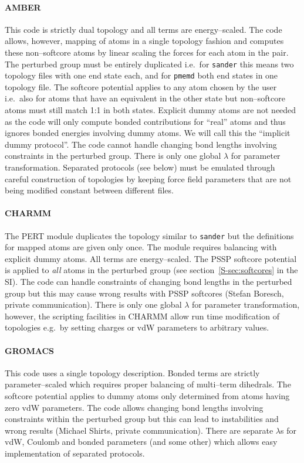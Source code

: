 \documentclass[journal=jctcce,manuscript=article]{achemso}
\newcommand{\progname}[1]{\texttt{#1}}
\begin{document}
\paragraph{AMBER} This code is strictly dual topology and all terms
are energy--scaled.  The code allows, however, mapping of atoms in a
single topology fashion and computes these non--softcore atoms 
by linear scaling the forces for each atom in the pair. 
The perturbed group must be entirely duplicated i.e.\ for \progname{sander} 
this means two topology files with one end state each, and for \progname{pmemd} 
both end states in one topology file.  The softcore potential applies to any 
atom chosen by the user i.e.\ also for atoms that have an equivalent in the 
other state but non--softcore atoms must still match 1:1 in both states.  
Explicit dummy atoms are not needed as the code will only compute bonded 
contributions for ``real'' atoms and thus ignores bonded energies involving 
dummy atoms.  We will call this the ``implicit dummy protocol''. The code 
cannot handle changing bond lengths involving constraints 
in the perturbed group.  There is only one global $\lambda$ for parameter 
transformation.  Separated protocols (see below) must be emulated through 
careful construction of topologies by keeping force field parameters that are 
not being modified constant between different files.

\paragraph{CHARMM} The PERT module duplicates the topology similar to
\progname{sander} but the definitions for mapped atoms are given only once.
The module requires balancing with explicit dummy atoms.  All terms are
energy--scaled.  The PSSP softcore potential is applied to \emph{all}
atoms in the perturbed group (see section~\ref{S-sec:softcores} in the SI).  The code can handle
constraints of changing bond lengths in the perturbed group but this
may cause wrong results with PSSP softcores (Stefan Boresch, private
communication).  There is only one global $\lambda$ for parameter
transformation, however, the scripting facilities in CHARMM allow run time
modification of topologies e.g.\ by setting charges or vdW parameters
to arbitrary values.

\paragraph{GROMACS} This code uses a single topology description.
Bonded terms are strictly parameter--scaled which requires proper
balancing of multi--term dihedrals.  The softcore potential applies to dummy 
atoms only determined from atoms having zero vdW parameters.  The code
allows changing bond lengths involving constraints within the perturbed group 
but this can lead to instabilities and wrong results (Michael Shirts,
private communication).  There are separate $\lambda$s for vdW,
Coulomb and bonded parameters (and some other) which allows easy implementation 
of separated protocols.
\end{document}

